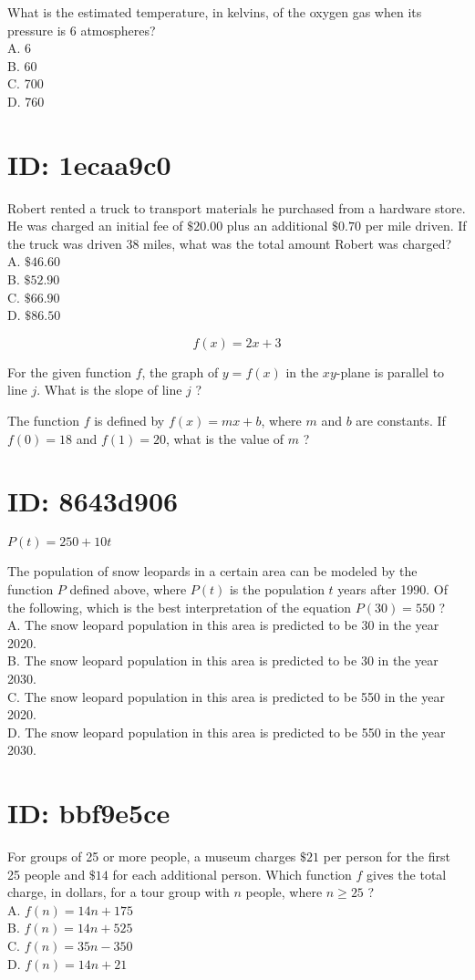 What is the estimated temperature, in kelvins, of the oxygen gas when its pressure is 6 atmospheres?\\
A. 6\\
B. 60\\
C. 700\\
D. 760

\section*{ID: 1ecaa9c0}
Robert rented a truck to transport materials he purchased from a hardware store. He was charged an initial fee of $\$ 20.00$ plus an additional $\$ 0.70$ per mile driven. If the truck was driven 38 miles, what was the total amount Robert was charged?\\
A. $\$ 46.60$\\
B. $\$ 52.90$\\
C. $\$ 66.90$\\
D. $\$ 86.50$

$$
f(x)=2 x+3
$$

For the given function $f$, the graph of $y=f(x)$ in the $x y$-plane is parallel to line $j$. What is the slope of line $j$ ?

The function $f$ is defined by $f(x)=m x+b$, where $m$ and $b$ are constants. If $f(0)=18$ and $f(1)=20$, what is the value of $m$ ?

\section*{ID: 8643d906}
$P(t)=250+10 t$

The population of snow leopards in a certain area can be modeled by the function $P$ defined above, where $P(t)$ is the population $t$ years after 1990. Of the following, which is the best interpretation of the equation $P(30)=550$ ?\\
A. The snow leopard population in this area is predicted to be 30 in the year 2020.\\
B. The snow leopard population in this area is predicted to be 30 in the year 2030.\\
C. The snow leopard population in this area is predicted to be 550 in the year 2020.\\
D. The snow leopard population in this area is predicted to be 550 in the year 2030.

\section*{ID: bbf9e5ce}
For groups of 25 or more people, a museum charges $\$ 21$ per person for the first 25 people and $\$ 14$ for each additional person. Which function $f$ gives the total charge, in dollars, for a tour group with $n$ people, where $n \geq 25$ ?\\
A. $f(n)=14 n+175$\\
B. $f(n)=14 n+525$\\
C. $f(n)=35 n-350$\\
D. $f(n)=14 n+21$

